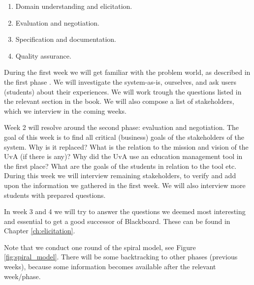 \begin{enumerate}
	\item Domain understanding and elicitation.
	\item Evaluation and negotiation.
	\item Specification and documentation.
	\item Quality assurance.
\end{enumerate}

During the first week we will get familiar with the problem world, as described in the first phase \cite{RE_book}. We will investigate the system-as-is, ourselves, and ask users (students) about their experiences. We will work trough the questions listed in the relevant section in the book. We will also compose a list of stakeholders, which we interview in the coming weeks.

Week 2 will resolve around the second phase: evaluation and negotiation. The goal of this week is to find all critical (business) goals of the stakeholders of the system. Why is it replaced? What is the relation to the mission and vision of the UvA (if there is any)? Why did the UvA use an education management tool in the first place? What are the goals of the students in relation to the tool etc. During this week we will interview remaining stakeholders, to verify and add upon the information we gathered in the first week. We will also interview more students with prepared questions.



In week 3 and 4 we will try to answer the questions we deemed most interesting and essential to get a good successor of Blackboard. These can be found in Chapter \ref{ch:elicitation}.

Note that we conduct one round of the spiral model, see Figure \ref{fig:spiral_model}. There will be some backtracking to other phases (previous weeks), because some information becomes available after the relevant week/phase. 

